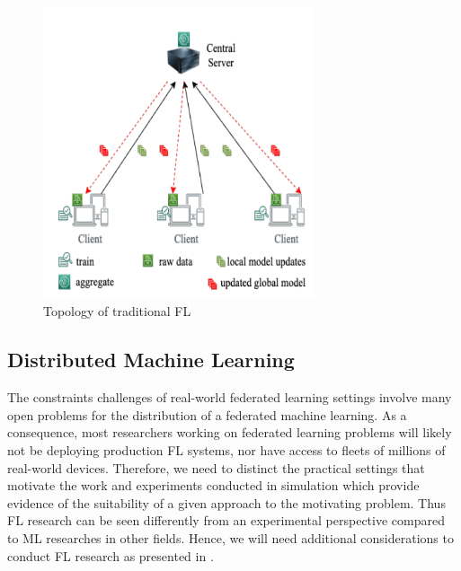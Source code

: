 \documentclass{article}
\begin{document}
\begin{figure}[!ht]
    \centering
    \includegraphics[width=8cm]{assets/topologyFL.PNG}
    \caption{Topology of traditional FL}
    \label{fig:TopologyFL}
\end{figure}

\subsection{Distributed Machine Learning}
The constraints challenges of real-world federated learning settings involve many open problems for the distribution of a federated machine learning. As a consequence, most researchers working on federated learning problems will likely not be deploying production FL systems, nor have access to fleets of millions of real-world devices. Therefore, we need to distinct the practical settings that motivate the work and experiments conducted in simulation which provide evidence of the suitability of a given approach to the motivating problem. Thus FL research can be seen differently from an experimental perspective compared to ML researches in other fields. Hence,  we will need additional considerations to conduct FL research as presented in \cite{kairouz_advances_2021}.
\end{document}
